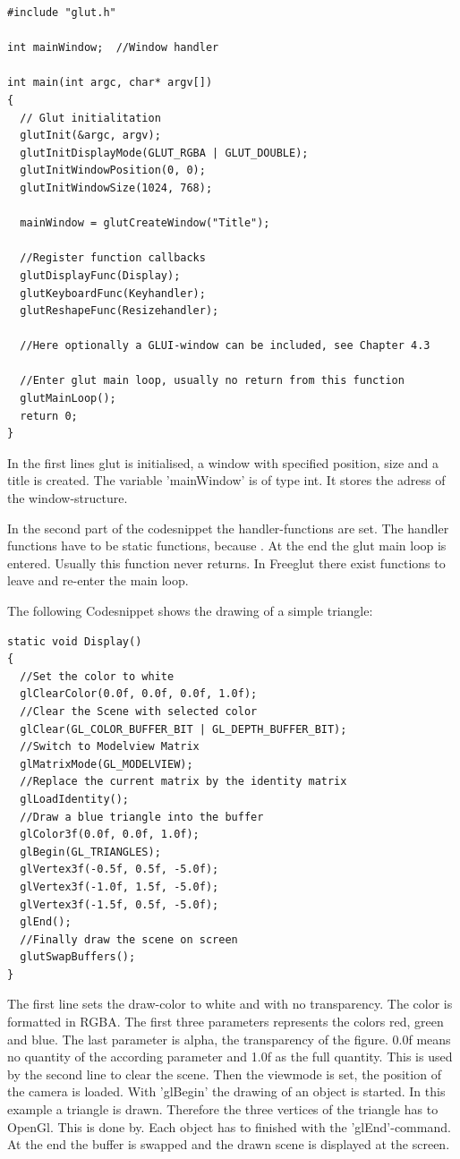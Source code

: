 \documentclass[10pt,a4paper,DIV=11]{scrreprt}
\begin{document}
\begin{lstlisting}[caption={Initialization a GLUT-program},label=lst:glut-init]
#include "glut.h"

int mainWindow;  //Window handler

int main(int argc, char* argv[])
{
  // Glut initialitation
  glutInit(&argc, argv);
  glutInitDisplayMode(GLUT_RGBA | GLUT_DOUBLE);
  glutInitWindowPosition(0, 0); 
  glutInitWindowSize(1024, 768);
  
  mainWindow = glutCreateWindow("Title");
  
  //Register function callbacks
  glutDisplayFunc(Display);
  glutKeyboardFunc(Keyhandler);
  glutReshapeFunc(Resizehandler);
  
  //Here optionally a GLUI-window can be included, see Chapter 4.3
  
  //Enter glut main loop, usually no return from this function
  glutMainLoop(); 
  return 0;
}
\end{lstlisting}

In the first lines glut is initialised, a window with specified position, size and a title is created.
The variable 'mainWindow' is of type int. It stores the adress of the window-structure.

In the second part of the codesnippet the handler-functions are set. The handler functions have to be static functions, because .
At the end the glut main loop is entered. Usually this function never returns. In Freeglut there exist functions to leave and re-enter the main loop.

The following Codesnippet shows the drawing of a simple triangle:

\begin{lstlisting}[caption={Drawing some graphics},label=lst:glut-draw]
static void Display()
{
  //Set the color to white
  glClearColor(0.0f, 0.0f, 0.0f, 1.0f);
  //Clear the Scene with selected color
  glClear(GL_COLOR_BUFFER_BIT | GL_DEPTH_BUFFER_BIT);
  //Switch to Modelview Matrix
  glMatrixMode(GL_MODELVIEW);
  //Replace the current matrix by the identity matrix
  glLoadIdentity();
  //Draw a blue triangle into the buffer
  glColor3f(0.0f, 0.0f, 1.0f);
  glBegin(GL_TRIANGLES);
  glVertex3f(-0.5f, 0.5f, -5.0f);
  glVertex3f(-1.0f, 1.5f, -5.0f);
  glVertex3f(-1.5f, 0.5f, -5.0f);
  glEnd();
  //Finally draw the scene on screen
  glutSwapBuffers();
}
\end{lstlisting}

The first line sets the draw-color to white and with no transparency. The color is formatted in RGBA. The first three parameters represents the colors red, green and blue. The last parameter is alpha, the transparency of the figure. 0.0f means no quantity of the according parameter and 1.0f as the full quantity.
 This is used by the second line to clear the scene.
Then the viewmode is set, the position of the camera is loaded.
With 'glBegin' the drawing of an object is started. In this example a triangle is drawn. Therefore the three vertices of the triangle has to OpenGl. This is done by. Each object has to finished with the 'glEnd'-command.
At the end the buffer is swapped and the drawn scene is displayed at the screen.
\end{document}
